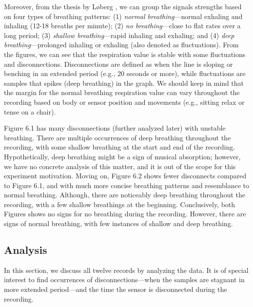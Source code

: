Moreover, from the thesis by Løberg \cite{fredrik}, we can group the signals strengths based on four types of breathing patterns: (1) \textit{normal breathing}---normal exhaling and inhaling (12-18 breaths per minute); (2) \textit{no breathing}---close to flat rates over a long period; (3) \textit{shallow breathing}---rapid inhaling and exhaling; and (4) \textit{deep breathing}---prolonged inhaling or exhaling (also denoted as fluctuations). From the figures, we can see that the respiration value is stable with some fluctuations and disconnections. Disconnections are defined as when the line is sloping or benching in an extended period (e.g., 20 seconds or more), while fluctuations are samples that spikes (deep breathing) in the graph. We should keep in mind that the margin for the normal breathing respiration value can vary throughout the recording based on body or sensor position and movements (e.g., sitting relax or tense on a chair). 

Figure 6.1 has many disconnections (further analyzed later) with unstable breathing. There are multiple occurrences of deep breathing throughout the recording, with some shallow breathing at the start and end of the recording. Hypothetically, deep breathing might be a sign of musical absorption; however, we have no concrete analysis of this matter, and it is out of the scope for this experiment motivation. Moving on, Figure 6.2 shows fewer disconnects compared to Figure 6.1, and with much more concise breathing patterns and resemblance to normal breathing. Although, there are noticeably deep breathing throughout the recording, with a few shallow breathings at the beginning. Conclusively, both Figures shows no signs for no breathing during the recording. However, there are signs of normal breathing, with few instances of shallow and deep breathing. 

\subsection{Analysis}
In this section, we discuss all twelve records by analyzing the data. It is of special interest to find occurrences of disconnections---when the samples are stagnant in more extended period---and the time the sensor is disconnected during the recording.

